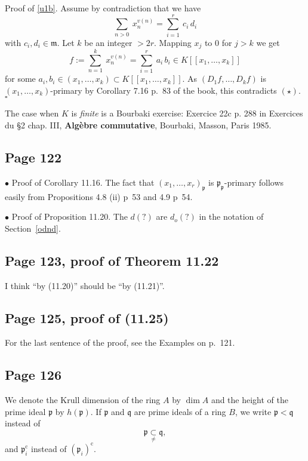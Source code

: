 \documentclass[parskip=half,fontsize=12pt]{scrartcl}%
\newcommand{\oo}{\operatorname}\newcommand{\ooo}{\operatorname*}
\newcommand{\mf}{\mathfrak}
\newcommand{\ppp}{\mf p}
\newcommand{\bu}{\bullet}
\begin{document}
Proof of \eqref{u1b}. Assume by contradiction that we have 
$$
\sum_{n>0}\ x_n^{v(n)}=\sum_{i=1}^r\ c_i\,d_i
$$ 
with $c_i,d_i\in\mf m$. Let $k$ be an integer $>2r$. Mapping $x_j$ to $0$ for $j>k$ we get 
$$
f:=\sum_{n=1}^k\ x_n^{v(n)}=\sum_{i=1}^r\ a_i\,b_i\in K[[x_1,\dots,x_k]]
$$ 
for some $a_i,b_i\in(x_1,\dots,x_k)\subset K[[x_1,\dots,x_k]]$. As $(D_1f,\dots,D_kf)$ is $(x_1,\dots,x_k)$-primary by Corollary 7.16 p.~83 of the book, this contradicts $(\star)$. $\square$

The case when $K$ is \emph{finite} is a Bourbaki exercise: Exercice 22c p. 288 in Exercices du \S2 chap. III, \textbf{Algèbre commutative}, Bourbaki, Masson, Paris 1985.

\subsection{Page 122}%

$\bu$ Proof of Corollary 11.16. The fact that $(x_1,\dots,x_r)_\ppp$ is $\ppp_\ppp$-primary follows easily from Propositions 4.8 (ii) p~53 and 4.9 p~54.

$\bu$ Proof of Proposition 11.20. The $d(?)$ are $d_o(?)$ in the notation of Section~\ref{odnd}.

\subsection{Page 123, proof of Theorem 11.22}%

I think ``by (11.20)'' should be ``by (11.21)''.

\subsection{Page 125, proof of (11.25)}%

For the last sentence of the proof, see the Examples on p.~121.

\subsection{Page 126}%

We denote the Krull dimension of the ring $A$ by $\dim A$ and the height of the prime ideal $\ppp$ by $h(\ppp)$. If $\ppp$ and $\mf q$ are prime ideals of a ring $B$, we write $\ppp<\mf q$ instead of 
$$
\ppp\underset\ne\subset\mf q,
$$ 
and $\ppp_i^{\oo c}$ instead of $(\ppp_i)^{\oo c}$. 
\end{document}
